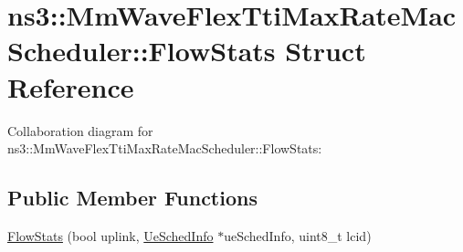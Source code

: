 \hypertarget{structns3_1_1MmWaveFlexTtiMaxRateMacScheduler_1_1FlowStats}{}\section{ns3\+:\+:Mm\+Wave\+Flex\+Tti\+Max\+Rate\+Mac\+Scheduler\+:\+:Flow\+Stats Struct Reference}
\label{structns3_1_1MmWaveFlexTtiMaxRateMacScheduler_1_1FlowStats}


Collaboration diagram for ns3\+:\+:Mm\+Wave\+Flex\+Tti\+Max\+Rate\+Mac\+Scheduler\+:\+:Flow\+Stats\+:
\subsection*{Public Member Functions}
\begin{DoxyCompactItemize}
\item 
\hyperlink{structns3_1_1MmWaveFlexTtiMaxRateMacScheduler_1_1FlowStats_ac534fd127dd92b54a9778d820ccc4930}{Flow\+Stats} (bool uplink, \hyperlink{structns3_1_1MmWaveFlexTtiMaxRateMacScheduler_1_1UeSchedInfo}{Ue\+Sched\+Info} $\ast$ue\+Sched\+Info, uint8\+\_\+t lcid)
\end{DoxyCompactItemize}
